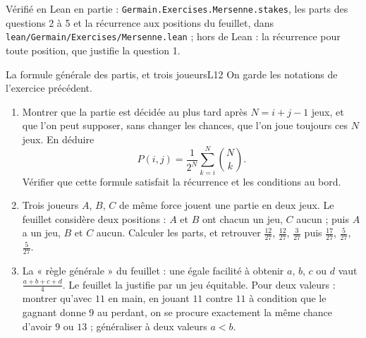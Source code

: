 \documentclass[11pt,a4paper]{article}
\begin{document}
\begin{solution}
Vérifié en Lean en partie : \texttt{Germain.Exercises.Mersenne.stakes}, les parts des
questions 2 à 5 et la récurrence aux positions du feuillet, dans \texttt{lean/Germain/Exercises/Mersenne.lean} ; hors de
Lean : la récurrence pour toute position, que justifie la question 1.

\end{solution}

\begin{exercice}{La formule générale des partis, et trois joueurs}{L1}{2}
On garde les notations de l'exercice précédent.
\begin{enumerate}
\item Montrer que la partie est décidée au plus tard après $N = i + j - 1$ jeux,
  et que l'on peut supposer, sans changer les chances, que l'on joue toujours ces
  $N$ jeux. En déduire
  \[
  P(i,j) = \frac{1}{2^{N}}\sum_{k=i}^{N}\binom{N}{k}.
  \]
  Vérifier que cette formule satisfait la récurrence et les conditions au bord.
\item Trois joueurs $A$, $B$, $C$ de même force jouent une partie en deux jeux.
  Le feuillet considère deux positions : $A$ et $B$ ont chacun un jeu, $C$ aucun ;
  puis $A$ a un jeu, $B$ et $C$ aucun. Calculer les parts, et retrouver
  $\frac{12}{27}$, $\frac{12}{27}$, $\frac{3}{27}$ puis $\frac{17}{27}$,
  $\frac{5}{27}$, $\frac{5}{27}$.
\item La « règle générale » du feuillet : une égale facilité à obtenir $a$, $b$,
  $c$ ou $d$ vaut $\frac{a+b+c+d}{4}$. Le feuillet la justifie par un jeu
  équitable. Pour deux valeurs : montrer qu'avec $11$ en main, en jouant $11$
  contre $11$ à condition que le gagnant donne $9$ au perdant, on se procure
  exactement la même chance d'avoir $9$ ou $13$ ; généraliser à deux valeurs
  $a < b$.
\end{enumerate}
\end{exercice}
\end{document}
